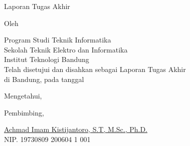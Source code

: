 \clearpage
\pagestyle{empty}

\begin{center}
	\smallskip

	\Large \bfseries \MakeUppercase{\thetitle}
	\vfill

	\Large Laporan Tugas Akhir
	\vfill

	\large Oleh

	\Large \theauthor

	\large Program Studi Teknik Informatika \\

	\normalsize \normalfont
	Sekolah Teknik Elektro dan Informatika \\
	Institut Teknologi Bandung \\

	\vfill
	\normalsize \normalfont
	Telah disetujui dan disahkan sebagai Laporan Tugas Akhir \\
	di Bandung, pada tanggal \tanggalpengesahan

	Mengetahui,

	Pembimbing,

	\vfill
	\underline{Achmad Imam Kistijantoro, S.T, M.Sc., Ph.D.
	} \\
	NIP. 19730809 200604 1 001

\end{center}
\clearpage
